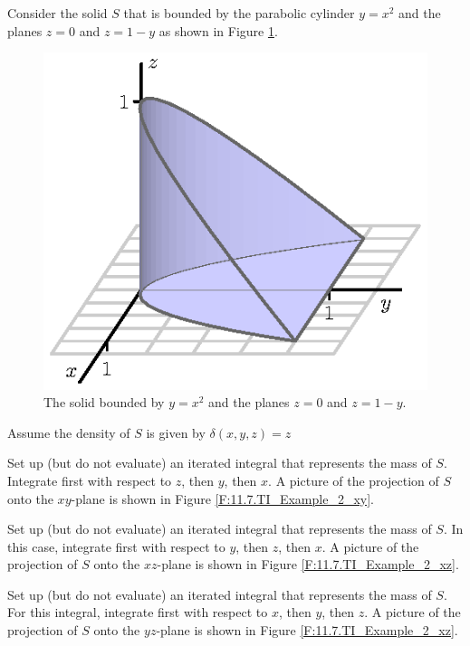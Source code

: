 \begin{exercises} 

\item Consider the solid $S$ that is bounded by the parabolic cylinder $y = x^2$ and the planes $z=0$ and $z=1-y$ as shown in Figure \ref{F:11.7.TI_Example_2}. 
\begin{figure}[ht]
\begin{center}
  \includegraphics{figures/fig_11_7_solid.eps}
\end{center}
\caption{The solid bounded by $y = x^2$ and the planes $z=0$ and $z=1-y$.}
\label{F:11.7.TI_Example_2}
\end{figure}

Assume the density of $S$ is given by $\delta(x,y,z) = z$
    \ba
    \item Set up (but do not evaluate) an iterated integral that represents the mass of $S$.  Integrate first with respect to $z$, then $y$, then $x$.  A picture of the projection of $S$ onto the $xy$-plane is shown in Figure \ref{F:11.7.TI_Example_2_xy}.

    \item Set up (but do not evaluate) an iterated integral that represents the mass of $S$.  In this case, integrate first with respect to $y$, then $z$, then $x$.  A picture of the projection of $S$ onto the $xz$-plane is shown in Figure \ref{F:11.7.TI_Example_2_xz}.

	\item Set up (but do not evaluate) an iterated integral that represents the mass of $S$.  For this integral, integrate first with respect to $x$, then $y$, then $z$.  A picture of the projection of $S$ onto the $yz$-plane is shown in Figure \ref{F:11.7.TI_Example_2_xz}.


\end{exercises}
